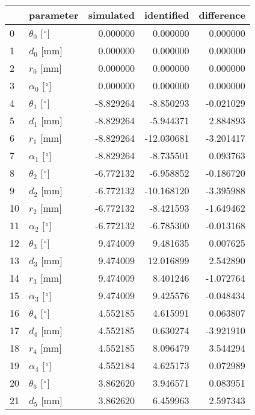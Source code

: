 \documentclass{standalone}%
\begin{document}
%
\normalsize%
\begin{tabular}{llrrr}
\toprule
{} &                 parameter & simulated & identified & difference \\
\midrule
0  &  $\theta_{0}$ [$\degree$] &  0.000000 &   0.000000 &   0.000000 \\
1  &              $d_{0}$ [mm] &  0.000000 &   0.000000 &   0.000000 \\
2  &              $r_{0}$ [mm] &  0.000000 &   0.000000 &   0.000000 \\
3  &  $\alpha_{0}$ [$\degree$] &  0.000000 &   0.000000 &   0.000000 \\
4  &  $\theta_{1}$ [$\degree$] & -8.829264 &  -8.850293 &  -0.021029 \\
5  &              $d_{1}$ [mm] & -8.829264 &  -5.944371 &   2.884893 \\
6  &              $r_{1}$ [mm] & -8.829264 & -12.030681 &  -3.201417 \\
7  &  $\alpha_{1}$ [$\degree$] & -8.829264 &  -8.735501 &   0.093763 \\
8  &  $\theta_{2}$ [$\degree$] & -6.772132 &  -6.958852 &  -0.186720 \\
9  &              $d_{2}$ [mm] & -6.772132 & -10.168120 &  -3.395988 \\
10 &              $r_{2}$ [mm] & -6.772132 &  -8.421593 &  -1.649462 \\
11 &  $\alpha_{2}$ [$\degree$] & -6.772132 &  -6.785300 &  -0.013168 \\
12 &  $\theta_{3}$ [$\degree$] &  9.474009 &   9.481635 &   0.007625 \\
13 &              $d_{3}$ [mm] &  9.474009 &  12.016899 &   2.542890 \\
14 &              $r_{3}$ [mm] &  9.474009 &   8.401246 &  -1.072764 \\
15 &  $\alpha_{3}$ [$\degree$] &  9.474009 &   9.425576 &  -0.048434 \\
16 &  $\theta_{4}$ [$\degree$] &  4.552185 &   4.615991 &   0.063807 \\
17 &              $d_{4}$ [mm] &  4.552185 &   0.630274 &  -3.921910 \\
18 &              $r_{4}$ [mm] &  4.552185 &   8.096479 &   3.544294 \\
19 &  $\alpha_{4}$ [$\degree$] &  4.552184 &   4.625173 &   0.072989 \\
20 &  $\theta_{5}$ [$\degree$] &  3.862620 &   3.946571 &   0.083951 \\
21 &              $d_{5}$ [mm] &  3.862620 &   6.459963 &   2.597343 \\

\end{tabular}
\end{document}
